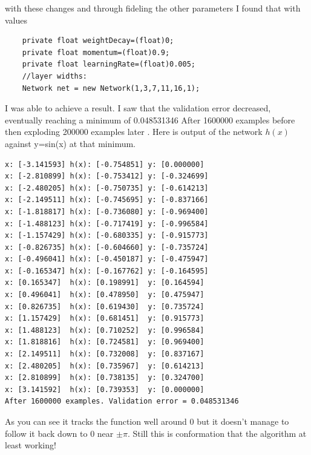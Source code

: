 \documentclass[11pt]{article} %
\begin{document}
with these changes and through fideling the other parameters I found that with values
\begin{lstlisting}
    private float weightDecay=(float)0;
    private float momentum=(float)0.9;
    private float learningRate=(float)0.005;
    //layer widths:
    Network net = new Network(1,3,7,11,16,1);
\end{lstlisting}
I was able to achieve a result. I saw that the validation error decreased, eventually reaching a minimum of 0.048531346 After 1600000 examples before then exploding 200000 examples later . Here is output of the network $h(x)$ against y=sin(x) at that minimum.
\begin{lstlisting}
x: [-3.141593] h(x): [-0.754851] y: [0.000000]
x: [-2.810899] h(x): [-0.753412] y: [-0.324699]
x: [-2.480205] h(x): [-0.750735] y: [-0.614213]
x: [-2.149511] h(x): [-0.745695] y: [-0.837166]
x: [-1.818817] h(x): [-0.736080] y: [-0.969400]
x: [-1.488123] h(x): [-0.717419] y: [-0.996584]
x: [-1.157429] h(x): [-0.680335] y: [-0.915773]
x: [-0.826735] h(x): [-0.604660] y: [-0.735724]
x: [-0.496041] h(x): [-0.450187] y: [-0.475947]
x: [-0.165347] h(x): [-0.167762] y: [-0.164595]
x: [0.165347]  h(x): [0.198991]  y: [0.164594]
x: [0.496041]  h(x): [0.478950]  y: [0.475947]
x: [0.826735]  h(x): [0.619430]  y: [0.735724]
x: [1.157429]  h(x): [0.681451]  y: [0.915773]
x: [1.488123]  h(x): [0.710252]  y: [0.996584]
x: [1.818816]  h(x): [0.724581]  y: [0.969400]
x: [2.149511]  h(x): [0.732008]  y: [0.837167]
x: [2.480205]  h(x): [0.735967]  y: [0.614213]
x: [2.810899]  h(x): [0.738135]  y: [0.324700]
x: [3.141592]  h(x): [0.739353]  y: [0.000000]
After 1600000 examples. Validation error = 0.048531346
\end{lstlisting}
As you can see it tracks the function well around 0 but it doesn't manage to follow it back down to 0 near $\pm \pi$. Still this is conformation that the algorithm at least working! 
\end{document}
